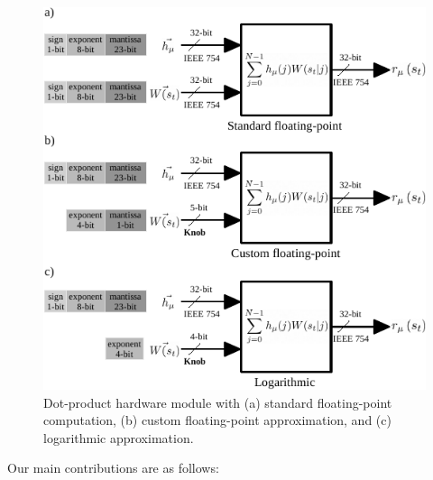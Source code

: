 \begin{figure}
	\includegraphics[width=\columnwidth]{../figures/dot-product_unit.pdf}
	\caption{Dot-product hardware module with (a) standard floating-point computation, (b) custom floating-point approximation, and (c) logarithmic approximation.}
	\label{fig:dot_product_unit}
\end{figure}

Our main contributions are as follows:

